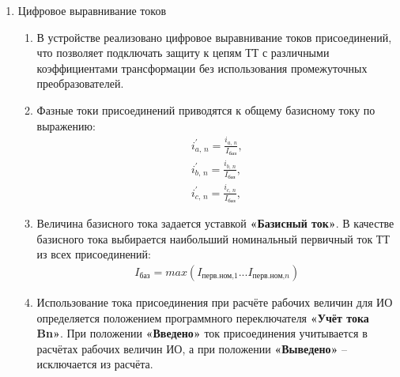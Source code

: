 \begin{enumerate}[label=\arabic{section}.\arabic{subsection}.\arabic{enumi}, labelsep=4pt, leftmargin=0pt, itemindent=57pt, itemsep=0pt, parsep=5pt]
\begin{enumerate}[label=\arabic{section}.\arabic{subsection}.\arabic{enumi}.\arabic*, labelsep=4pt, leftmargin=0em, itemindent=65pt, parsep=0pt]
\begin{longtable}{|>{\centering\arraybackslash}m{6.4cm}|>{\centering\arraybackslash}m{4cm}|>{\centering\arraybackslash}m{2.8cm}|>{\centering\arraybackslash}m{2.8cm}|}
\end{longtable}
\normalsize

\end{enumerate}


\item Цифровое выравнивание токов

\begin{enumerate}[label=\arabic{section}.\arabic{subsection}.\arabic{enumi}.\arabic*, labelsep=4pt, leftmargin=0em, itemindent=65pt, parsep=0pt]

\item
В устройстве реализовано цифровое выравнивание токов присоединений, что позволяет подключать защиту к цепям ТТ с различными коэффициентами трансформации без использования промежуточных преобразователей.

\item
Фазные токи присоединений приводятся к общему базисному току по выражению:
\begin{align}
i_{a,\,n}^{'}=\frac{i_{a,\,n}}{I_\textit{баз}}, \\
i_{b,\,n}^{'}=\frac{i_{b,\,n}}{I_\textit{баз}}, \\
i_{c,\,n}^{'}=\frac{i_{c,\,n}}{I_\textit{баз}},
\end{align}

\item
Величина базисного тока задается уставкой \textbf{«Базисный ток»}. В качестве базисного тока выбирается наибольший номинальный первичный ток ТТ из всех присоединений:
\begin{align}
I_\textit{баз}=max(I_\textit{перв.ном,1}...I_\textit{перв.ном,n})
\end{align}

\item
Использование тока присоединения при расчёте рабочих величин для ИО определяется положением программного переключателя \textbf{«Учёт тока Bn»}.
При положении \textbf{«Введено»} ток присоединения учитывается в расчётах рабочих величин ИО, а при положении \textbf{«Выведено»} – исключается из расчёта.


\end{enumerate}
\end{enumerate}
